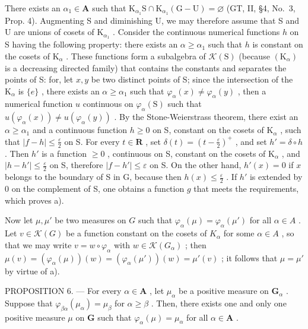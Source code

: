 There exists an \(\alpha_{1} \in \mathbf{A}\) such that \(\mathrm{K}_{\alpha_1}\mathrm{S} \cap \mathrm{K}_{\alpha_1}(\mathrm{G} - \mathrm{U}) = \varnothing\) (GT, II, §4, No.~3, Prop. 4). Augmenting S and diminishing U, we may therefore assume that S and U are unions of cosets of \(\mathrm{K}_{\alpha_1}\) . Consider the continuous numerical functions \(h\) on S having the following property: there exists an \(\alpha \geqslant \alpha_{1}\) such that \(h\) is constant on the cosets of \(\mathrm{K}_{\alpha}\) . These functions form a subalgebra of \(\mathcal{K}(\mathrm{S})\) (because \((\mathrm{K}_{\alpha})\) is a decreasing directed family) that contains the constants and separates the points of S: for, let \(x, y\) be two distinct points of S; since the intersection of the \(\mathrm{K}_{\alpha}\) is \(\{e\}\) , there exists an \(\alpha \geqslant \alpha_{1}\) such that \(\varphi_{\alpha}(x) \neq \varphi_{\alpha}(y)\) , then a numerical function \(u\) continuous on \(\varphi_{\alpha}(\mathrm{S})\) such that \(u(\varphi_{\alpha}(x)) \neq u(\varphi_{\alpha}(y))\) . By the Stone-Weierstrass theorem, there exist an \(\alpha \geqslant \alpha_{1}\) and a continuous function \(h \geqslant 0\) on S, constant on the cosets of \(\mathrm{K}_{\alpha}\) , such that \(|f - h| \leqslant \frac{\varepsilon}{2}\) on S. For every \(t \in \mathbf{R}\) , set \(\delta(t) = \left(t - \frac{\varepsilon}{2}\right)^+\) , and set \(h' = \delta \circ h\) . Then \(h'\) is a function \(\geqslant 0\) , continuous on S, constant on the cosets of \(\mathrm{K}_{\alpha}\) , and \(|h - h'| \leqslant \frac{\varepsilon}{2}\) on S, therefore \(|f - h'| \leqslant \varepsilon\) on S. On the other hand, \(h'(x) = 0\) if \(x\) belongs to the boundary of S in G, because then \(h(x) \leqslant \frac{\varepsilon}{2}\) . If \(h'\) is extended by 0 on the complement of S, one obtains a function \(g\) that meets the requirements, which proves a).

Now let \(\mu, \mu'\) be two measures on \(G\) such that \(\varphi_{\alpha}(\mu) = \varphi_{\alpha}(\mu')\) for all \(\alpha \in A\) . Let \(v \in \mathcal{K}(G)\) be a function constant on the cosets of \(K_{\alpha}\) for some \(\alpha \in A\) , so that we may write \(v = w \circ \varphi_{\alpha}\) with \(w \in \mathcal{K}(G_{\alpha})\) ; then \(\mu(v) = (\varphi_{\alpha}(\mu))(w) = (\varphi_{\alpha}(\mu'))(w) = \mu'(v)\) ; it follows that \(\mu = \mu'\) by virtue of a).

PROPOSITION 6. --- For every \(\alpha \in \mathbf{A}\) , let \(\mu_{\alpha}\) be a positive measure on \(\mathbf{G}_{\alpha}\) . Suppose that \(\varphi_{\beta \alpha}(\mu_{\alpha}) = \mu_{\beta}\) for \(\alpha \geqslant \beta\) . Then, there exists one and only one positive measure \(\mu\) on \(\mathbf{G}\) such that \(\varphi_{\alpha}(\mu) = \mu_{\alpha}\) for all \(\alpha \in \mathbf{A}\) .

